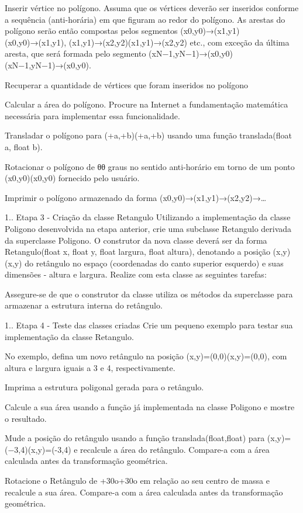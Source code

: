 Inserir vértice no polígono. Assuma que os vértices deverão ser inseridos conforme a sequência (anti-\/horária) em que figuram ao redor do polígono. As arestas do polígono serão então compostas pelos segmentos (x0,y0)→(x1,y1)(x0,y0)→(x1,y1), (x1,y1)→(x2,y2)(x1,y1)→(x2,y2) etc., com exceção da última aresta, que será formada pelo segmento (x\+N−1,y\+N−1)→(x0,y0)(x\+N−1,y\+N−1)→(x0,y0).

Recuperar a quantidade de vértices que foram inseridos no polígono

Calcular a área do polígono. Procure na Internet a fundamentação matemática necessária para implementar essa funcionalidade.

Transladar o polígono para (+a,+b)(+a,+b) usando uma função translada(float a, float b).

Rotacionar o polígono de θθ graus no sentido anti-\/horário em torno de um ponto (x0,y0)(x0,y0) fornecido pelo usuário.

Imprimir o polígono armazenado da forma (x0,y0)→(x1,y1)→(x2,y2)→…​

1.. Etapa 3 -\/ Criação da classe Retangulo Utilizando a implementação da classe Poligono desenvolvida na etapa anterior, crie uma subclasse Retangulo derivada da superclasse Poligono. O construtor da nova classe deverá ser da forma Retangulo(float x, float y, float largura, float altura), denotando a posição (x,y)(x,y) do retângulo no espaço (coordenadas do canto superior esquerdo) e suas dimensões -\/ altura e largura. Realize com esta classe as seguintes tarefas\+:

Assegure-\/se de que o construtor da classe utiliza os métodos da superclasse para armazenar a estrutura interna do retângulo.

1.. Etapa 4 -\/ Teste das classes criadas Crie um pequeno exemplo para testar sua implementação da classe Retangulo.

No exemplo, defina um novo retângulo na posição (x,y)=(0,0)(x,y)=(0,0), com altura e largura iguais a 3 e 4, respectivamente.

Imprima a estrutura poligonal gerada para o retângulo.

Calcule a sua área usando a função já implementada na classe Poligono e mostre o resultado.

Mude a posição do retângulo usando a função translada(float,float) para (x,y)=(−3,4)(x,y)=(-\/3,4) e recalcule a área do retângulo. Compare-\/a com a área calculada antes da transformação geométrica.

Rotacione o Retângulo de +30o+30o em relação ao seu centro de massa e recalcule a sua área. Compare-\/a com a área calculada antes da transformação geométrica. 